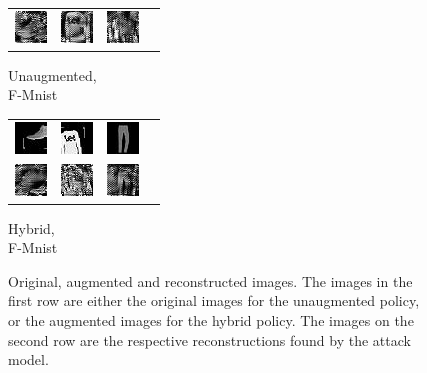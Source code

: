 \begin{figure}[h]
\begin{subtable}{.25\linewidth}
{\begin{tabular}{ l l l l }
  \includegraphics[width = 24pt]{repimages_fmnist/rec_1_unaug.jpg} &  \includegraphics[width = 24pt]{repimages_fmnist/rec_2_unaug.jpg}  &  \includegraphics[width = 24pt]{repimages_fmnist/rec_3_unaug.jpg}  &   \\
\end{tabular}}
\caption{Unaugmented, \\ F-Mnist}%
\end{subtable}%
\hfill
\begin{subtable}{.25\linewidth}\centering
{\begin{tabular}{ l l l l }
  \includegraphics[width = 24pt]{repimages_fmnist/ori_1_hybrid.jpg} &  \includegraphics[width = 24pt]{repimages_fmnist/ori_2_hybrid.jpg}  & \includegraphics[width = 24pt]{repimages_fmnist/ori_3_hybrid.jpg} \\
  \includegraphics[width = 24pt]{repimages_fmnist/rec_1_hybrid.jpg} &  \includegraphics[width = 24pt]{repimages_fmnist/rec_2_hybrid.jpg}  &  \includegraphics[width = 24pt]{repimages_fmnist/rec_3_hybrid.jpg}  &   \\
\end{tabular}}
\caption{Hybrid, \\ F-Mnist}%
\end{subtable}%
\caption{ Original, augmented and reconstructed images. The images in the first row are either the original images for the unaugmented policy, or the augmented images for the hybrid policy. The images on the second row are the respective reconstructions found by the attack model.}
    \label{fig:imgs}
\end{figure}
\endgroup

